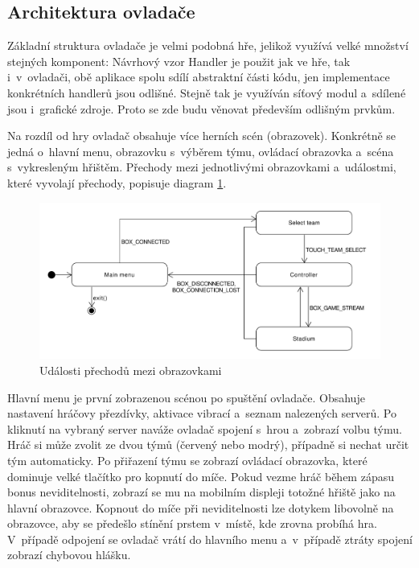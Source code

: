 \documentclass[thesis=B,czech,hidelinks]{FITthesis}[2012/06/26] %
\begin{document}
\subsection{Architektura ovladače}

Základní struktura ovladače je velmi podobná hře, jelikož využívá velké množství stejných komponent: Návrhový vzor Handler je použit jak ve hře, tak i~v~ovladači, obě aplikace spolu sdílí abstraktní části kódu, jen implementace konkrétních handlerů jsou odlišné. Stejně tak je využíván síťový modul a~sdílené jsou i~grafické zdroje. Proto se zde budu věnovat především odlišným prvkům.

Na rozdíl od hry ovladač obsahuje více herních scén (obrazovek). Konkrétně se jedná o~hlavní menu, obrazovku s~výběrem týmu, ovládací obrazovka a~scéna s~vykresleným hřištěm. Přechody mezi jednotlivými obrazovkami a~událostmi, které vyvolají přechody, popisuje diagram \ref{picture:controller_scenes}.

\begin{figure}[h]
\includegraphics[width=\textwidth]{controller_scenes}
\caption{Události přechodů mezi obrazovkami}
\label{picture:controller_scenes}
\end{figure}


Hlavní menu je první zobrazenou scénou po spuštění ovladače. Obsahuje nastavení hráčovy přezdívky, aktivace vibrací a~seznam nalezených serverů. Po kliknutí na vybraný server naváže ovladač spojení s~hrou a~zobrazí volbu týmu. Hráč si může zvolit ze dvou týmů (červený nebo modrý), případně si nechat určit tým automaticky. Po přiřazení týmu se zobrazí ovládací obrazovka, které dominuje velké tlačítko pro kopnutí do míče. Pokud vezme hráč během zápasu bonus neviditelnosti, zobrazí se mu na mobilním displeji totožné hřiště jako na hlavní obrazovce. Kopnout do míče při neviditelnosti lze dotykem libovolně na obrazovce, aby se předešlo stínění prstem v~místě, kde zrovna probíhá hra. V~případě odpojení se ovladač vrátí do hlavního menu a~v~případě ztráty spojení zobrazí chybovou hlášku.
\end{document}
